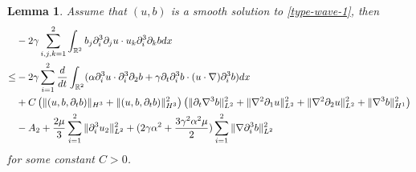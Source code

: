 \documentclass[reqno,11pt]{amsart}
\newtheorem{Lem}[Thm]{Lemma}
\def\R{\mathbb R}
\numberwithin{Thm}{section}
\begin{document}
\begin{Lem}\label{2.4}
Assume that $(u,b)$ is a smooth solution to \eqref{type-wave-1}, then
\begin{align}\label{AA2}
&-2\gamma\sum_{i,j,k=1}^2\int_{\R^2}b_j\partial_i^3\partial_ju\cdot u_k\partial_i^3\partial_kbdx\notag\\
\leq&
-2\gamma\sum_{i=1}^2\frac{d}{dt}\int_{\R^2}(\alpha\partial_i^3u\cdot\partial_i^3\partial_2b+\gamma\partial_{t}\partial_i^3b\cdot (u\cdot\nabla)\partial_i^3 b)dx\notag\\
&+C\left(\|(u,b,\partial_tb)\|_{H^{3}}+\|(u,b,\partial_tb)\|_{H^{3}}^2\right)\left(\|\partial_t\nabla^3b\|_{L^2}^2+\|\nabla^2\partial_1u\|_{L^2}^2+\|\nabla^2\partial_2u\|_{L^2}^2+\|\nabla^3 b\|_{H^1}^2\right)\notag\\
&-{A_{2}}+\frac{2\mu}{3}\sum_{i=1}^2\| \partial_i^3u_2\|_{L^2}^2+(2\gamma\alpha^2+\frac{3\gamma^2\alpha^2\mu}{2})\sum_{i=1}^2\|\nabla \partial_i^3b\|_{L^2}^2
\end{align}
for some constant $C>0$.

\end{Lem}
\end{document}
